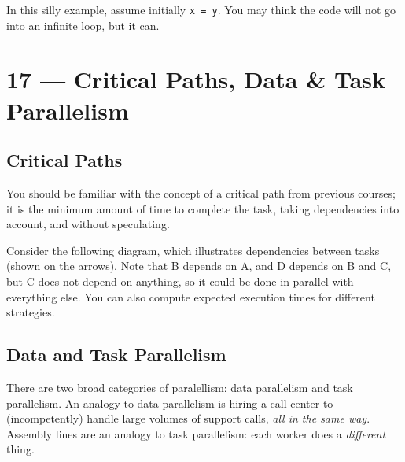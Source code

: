 \documentclass[a4paper]{report}
\begin{document}
In this silly example, assume initially {\tt x = y}. You may think the
code will not go into an infinite loop, but it can.










\chapter*{17 --- Critical Paths, Data \& Task Parallelism}


\section*{Critical Paths}
You should be familiar with the concept of a critical path from previous
courses; it is the minimum amount of time to complete the task, taking
dependencies into account, and without speculating.

Consider the following diagram, which illustrates dependencies between
tasks (shown on the arrows). 
Note that B depends on A, and D depends on B and C, but C does
not depend on anything, so it could be done in parallel with
everything else. You can also compute expected execution times
for different strategies.
\begin{center}
\end{center}

\section*{Data and Task Parallelism}
There are two broad categories of paralellism: data parallelism and
task parallelism. An analogy to data parallelism is hiring a call
center to (incompetently) handle large volumes of support calls,
\emph{all in the same way}. Assembly lines are an analogy to task
parallelism: each worker does a \emph{different} thing.
\end{document}
